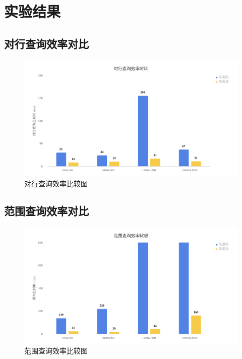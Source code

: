 \documentclass[11pt, a4paper]{article}
\begin{document}
\section{实验结果}
\subsection{对行查询效率对比}
\begin{figure}[H]
  \begin{center}
    \includegraphics[width=6.5in]{img/row.png}
    \caption{对行查询效率比较图}\label{fig:row}
  \end{center}
\end{figure}
\subsection{范围查询效率对比}
\begin{figure}[H]
  \begin{center}
    \includegraphics[width=6.5in]{img/query.png}
    \caption{范围查询效率比较图}\label{fig:query}
  \end{center}
\end{figure}
\end{document}
